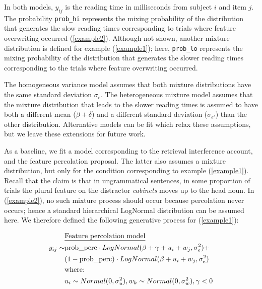 \documentclass{cambridge7A}\usepackage[]{graphicx}\usepackage[]{color}
\begin{document}
\noindent
In both models, 
$y_{ij}$ 
is the reading time in milliseconds from subject $i$ and item $j$.  The probability  \texttt{prob\_hi} represents the mixing probability of the distribution that generates the slow reading times corresponding to trials where feature overwriting occurred (\ref{example2}). Although not shown, another mixture distribution is defined for example (\ref{example1}); here, 
\texttt{prob\_lo} represents the mixing probability of the distribution that generates the slower reading times corresponding to the trials where feature overwriting occurred. 

The homogeneous variance model assumes that both mixture distributions have the same standard deviation $\sigma_e$.  The heterogeneous mixture model assumes that the mixture distribution that leads to the slower reading times is assumed to have both a different mean ($\beta+\delta$) and a different standard deviation ($\sigma_{e'}$) than the other distribution.
Alternative models can be fit which relax these assumptions, but we leave these extensions for future work.


As a baseline, we fit a model corresponding to the retrieval interference account,  and the 
feature percolation proposal. The latter also assumes a mixture distribution, but only for the condition corresponding to  example (\ref{example1}). Recall that the claim is that in ungrammatical sentences, in some proportion of trials the plural feature on the distractor \textit{cabinets} moves up to the head noun. In (\ref{example2}), no such mixture process should occur because percolation never occurs; hence a standard hierarchical LogNormal distribution can be assumed here. We therefore defined the following generative process for (\ref{example1}):

\begin{equation}
\begin{split}
       ~&\hbox{\underline{Feature percolation model}}\\
y_{ij} \sim& \hbox{prob\_perc} \cdot LogNormal(\beta+\gamma+u_i+w_j,\sigma_{e}^2)+\\
           ~& (1-\hbox{prob\_perc}) \cdot LogNormal(\beta+u_i+w_j,\sigma_e^2)\\
           ~& \hbox{where: }\\
           ~& u_i \sim Normal(0,\sigma_u^2), w_k \sim Normal(0,\sigma_w^2), \gamma < 0 \\ 
\end{split}
\end{equation}
\end{document}
